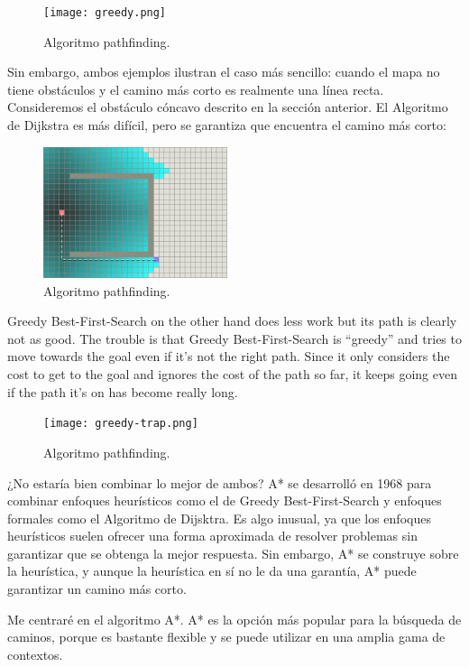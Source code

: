 \documentclass[reprint,amsmath,amssymb,aps]{revtex4-2}
\begin{document}
\begin{figure}[H]
 	\centering
 	\texttt{[image: greedy.png]}
 	\caption{Algoritmo pathfinding.}
 	\label{a}
\end{figure}

Sin embargo, ambos ejemplos ilustran el caso más sencillo: cuando el mapa no tiene obstáculos y el camino más corto es realmente una línea recta. Consideremos el obstáculo cóncavo descrito en la sección anterior. El Algoritmo de Dijkstra es más difícil, pero se garantiza que encuentra el camino más corto:

\begin{figure}[H]
 	\centering
 	\includegraphics[width=0.48\textwidth]{dijkstra-trap.png}
 	\caption{Algoritmo pathfinding.}
 	\label{dijkstra-trap}
\end{figure}
 
Greedy Best-First-Search on the other hand does less work but its path is clearly not as good. The trouble is that Greedy Best-First-Search is “greedy” and tries to move towards the goal even if it’s not the right path. Since it only considers the cost to get to the goal and ignores the cost of the path so far, it keeps going even if the path it’s on has become really long.
 
\begin{figure}[H]
 	\centering
 	\texttt{[image: greedy-trap.png]}
 	\caption{Algoritmo pathfinding.}
 	\label{a-trap}
\end{figure}

¿No estaría bien combinar lo mejor de ambos? A* se desarrolló en 1968 para combinar enfoques heurísticos como el de Greedy Best-First-Search y enfoques formales como el Algoritmo de Dijsktra. Es algo inusual, ya que los enfoques heurísticos suelen ofrecer una forma aproximada de resolver problemas sin garantizar que se obtenga la mejor respuesta. Sin embargo, A* se construye sobre la heurística, y aunque la heurística en sí no le da una garantía, A* puede garantizar un camino más corto.

Me centraré en el algoritmo A*. A* es la opción más popular para la búsqueda de caminos, porque es bastante flexible y se puede utilizar en una amplia gama de contextos.
\end{document}
